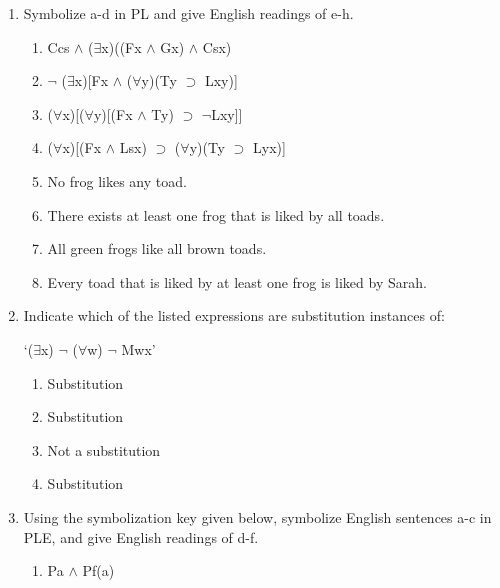 \documentclass[12pt,letterpaper]{article}
\begin{document}
\begin{enumerate}
    \item
      Symbolize a-d in PL and give English readings of e-h.
      \begin{enumerate}
        \item Ccs $\land$ ($\exists$x)((Fx $\land$ Gx) $\land$ Csx)
        \item $\neg$ ($\exists$x)[Fx $\land$ ($\forall$y)(Ty $\supset$ Lxy)]
        \item ($\forall$x)[($\forall$y)[(Fx $\land$ Ty) $\supset$ $\neg$Lxy]]
        \item ($\forall$x)[(Fx $\land$ Lsx) $\supset$ ($\forall$y)(Ty $\supset$ Lyx)]

        \item No frog likes any toad.
        \item There exists at least one frog that is liked by all toads.
        \item All green frogs like all brown toads.
        \item Every toad that is liked by at least one frog is liked by Sarah.
      \end{enumerate}

    \item
      Indicate which of the listed expressions are substitution instances of:

      `($\exists$x) $\neg$ ($\forall$w) $\neg$ Mwx'

      \begin{enumerate}
        \item Substitution
        \item Substitution
        \item Not a substitution
        \item Substitution
      \end{enumerate}

    \item
      Using the symbolization key given below,
      symbolize English sentences a-c in PLE,
      and give English readings of d-f.

      \begin{enumerate}
        \item Pa $\land$ Pf(a)
      \end{enumerate}
  \end{enumerate}
\end{document}

